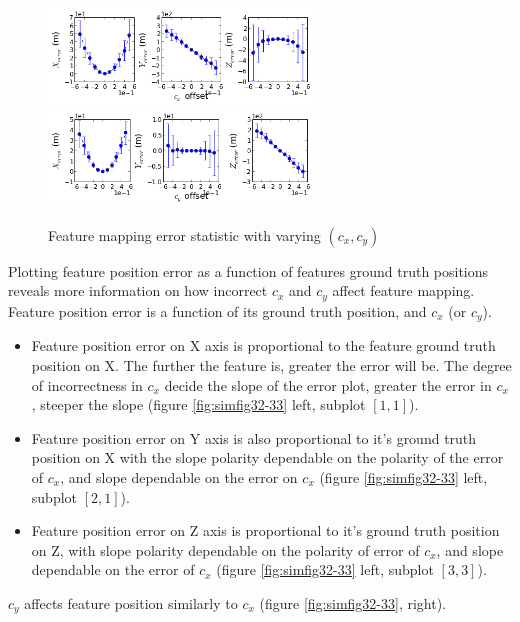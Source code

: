 \begin{figure}[h]
  \centering
  \includegraphics[width=7cm, keepaspectratio=true]{./Figures/SimulationFigures/Figure28.png}
  \includegraphics[width=7cm, keepaspectratio=true]{./Figures/SimulationFigures/Figure29.png}
  \caption{Feature mapping error statistic with varying $(c_x, c_y)$}
  \label{fig:simfig28-29}
\end{figure}

Plotting feature position error as a function of features ground truth
positions reveals more information on how incorrect $c_{x}$ and
$c_{y}$ affect feature mapping. Feature position error is a function
of its ground truth position, and $c_{x}$ (or $c_{y}$).

\begin{itemize}
  \item Feature position error on X axis is proportional to the
  feature ground truth position on X. The further the feature is,
  greater the error will be. The degree of incorrectness in $c_{x}$
  decide the slope of the error plot, greater the error in $c_{x}$,
  steeper the slope (figure \ref{fig:simfig32-33} left, subplot
  $[1,1]$).
  \item Feature position error on Y axis is also proportional to it's
  ground truth position on X with the slope polarity dependable on the
  polarity of the error of $c_{x}$, and slope dependable on
  the error on $c_{x}$ (figure \ref{fig:simfig32-33} left, subplot
  $[2,1]$).
  \item Feature position error on Z axis is proportional to it's
  ground truth position on Z, with slope polarity dependable on the
  polarity of error of $c_{x}$, and slope dependable on the error of
  $c_{x}$ (figure \ref{fig:simfig32-33} left, subplot $[3,3]$).
\end{itemize}

$c_{y}$ affects feature position similarly to $c_{x}$ (figure
\ref{fig:simfig32-33}, right).

